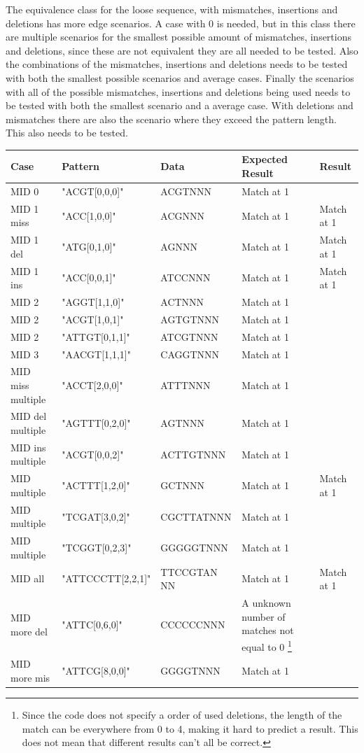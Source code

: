 \documentclass[12pt]{article}
\begin{document}
The equivalence class for the loose sequence, with mismatches, insertions and deletions has more edge scenarios.
A case with 0 is needed, but in this class there are multiple scenarios for the smallest possible amount of 
mismatches, insertions and deletions, since these are not equivalent they are all needed to be tested. Also the 
combinations of the mismatches, insertions and deletions needs to be tested with both the smallest possible
scenarios and average cases. Finally the scenarios with all of the possible mismatches, insertions and deletions 
being used needs to be tested with both the smallest scenario and a average case.
With deletions and mismatches there are also the scenario where they exceed the pattern length. This also needs to 
be tested.
\begin{table}[H]
\begin{tabular}{p{4cm}|p{3.6cm}|p{2.5cm}|p{2.2cm}|p{2.2cm}}
Case 			& Pattern & Data & Expected Result & Result \\ \hline
MID 0			& "ACGT[0,0,0]" & ACGTNNN & Match at 1 & \\ \hline
MID 1 miss		& "ACC[1,0,0]" & ACGNNN & Match at 1 & Match at 1\\ \hline
MID 1 del		& "ATG[0,1,0]" & AGNNN & Match at 1 & Match at 1 \\ \hline
MID 1 ins		& "ACC[0,0,1]" & ATCCNNN & Match at 1 & Match at 1\\ \hline
MID 2 			& "AGGT[1,1,0]" & ACTNNN & Match at 1 & \\ \hline
MID 2			& "ACGT[1,0,1]" & AGTGTNNN & Match at 1 & \\ \hline
MID 2 			& "ATTGT[0,1,1]" & ATCGTNNN & Match at 1 & \\ \hline
MID 3			& "AACGT[1,1,1]" & CAGGTNNN & Match at 1 & \\ \hline
MID miss multiple & "ACCT[2,0,0]" & ATTTNNN & Match at 1 & \\ \hline
MID del multiple & "AGTTT[0,2,0]" & AGTNNN & Match at 1 & \\ \hline
MID ins multiple & "ACGT[0,0,2]" & ACTTGTNNN & Match at 1 & \\ \hline 
MID multiple		& "ACTTT[1,2,0]" & GCTNNN & Match at 1 & Match at 1\\ \hline
MID multiple		& "TCGAT[3,0,2]" & CGCTTATNNN & Match at 1 & \\ \hline
MID multiple		& "TCGGT[0,2,3]" & GGGGGTNNN & Match at 1 & \\ \hline
MID all			& "ATTCCCTT[2,2,1]" & TTCCGTAN NN & Match at 1 & Match at 1\\ \hline
MID more del		& "ATTC[0,6,0]" & CCCCCCNNN & A unknown number of matches not equal to 0
\footnote{Since the code does not specify a order of used deletions, the 
length of the match can be everywhere from 0 to 4, making it hard to predict a result. 
This does not mean that different results can't all be correct. } & \\ \hline
MID more mis		& "ATTCG[8,0,0]" & GGGGTNNN & Match at 1 & \\ \hline
\end{tabular}
\end{table}
\end{document}
